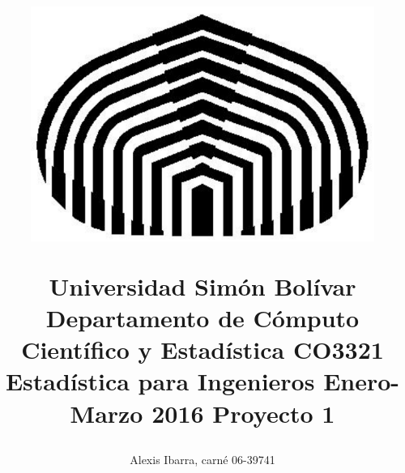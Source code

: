 \title{
  \begin{figure}[!ht]
    \centering
    \includegraphics[scale=0.3]{USBsym}
  \end{figure}
  Universidad Simón Bolívar \linebreak
  Departamento de Cómputo Científico y Estadística \linebreak
  CO3321 Estadística para Ingenieros \linebreak
  Enero-Marzo 2016 \linebreak
  \linebreak
  \linebreak
  \linebreak
  {\huge\bfseries Proyecto 1 }
  \vfill
}
\author{Alexis Ibarra, carné 06-39741}
\clearpage
\maketitle
\thispagestyle{empty}
